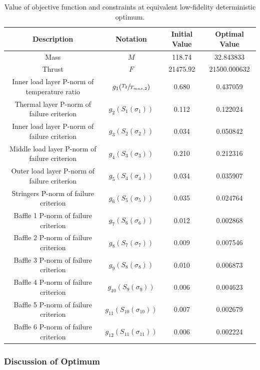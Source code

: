 \documentclass{article}
\begin{document}
\begin{table}
\caption[Equivalent low-fidelity deterministic optimization objective and constraint values]{Value of objective function and constraints at equivalent low-fidelity deterministic optimum.}
\label{tab:det-lo-optimal-values}
\begin{center}
\begin{tabular}[]{ c | c | c | c }
\textbf{Description} & \textbf{Notation} & \textbf{Initial Value} & \textbf{Optimal Value} \\ \hline
Mass & $M$ & 118.74 & 32.843833 \\ \hline
Thrust & $F$ & 21475.92 & 21500.000632 \\ \hline
Inner load layer P-norm of temperature ratio & $g_1(\sfrac{T_2}{T_{max,2}})$ & 0.680 & 0.437059 \\ \hline
Thermal layer P-norm of failure criterion & $g_2(S_1(\sigma_1))$ & 0.112 & 0.122024 \\ \hline
Inner load layer P-norm of failure criterion & $g_3(S_2(\sigma_2))$ & 0.034 & 0.050842 \\ \hline
Middle load layer P-norm of failure criterion & $g_4(S_3(\sigma_3))$ & 0.210 & 0.212316 \\ \hline
Outer load layer P-norm of failure criterion & $g_5(S_4(\sigma_4))$ & 0.034 & 0.035907 \\ \hline
Stringers P-norm of failure criterion & $g_6(S_5(\sigma_5))$ & 0.035 & 0.024764 \\ \hline
Baffle 1 P-norm of failure criterion & $g_7(S_6(\sigma_6))$ & 0.012 & 0.002868 \\ \hline
Baffle 2 P-norm of failure criterion & $g_8(S_7(\sigma_7))$ & 0.009 & 0.007546 \\ \hline
Baffle 3 P-norm of failure criterion & $g_9(S_8(\sigma_8))$ & 0.010 & 0.006873 \\ \hline
Baffle 4 P-norm of failure criterion & $g_{10}(S_9(\sigma_9))$ & 0.006 & 0.004623 \\ \hline
Baffle 5 P-norm of failure criterion & $g_{11}(S_{10}(\sigma_{10}))$ & 0.007 & 0.002679 \\ \hline
Baffle 6 P-norm of failure criterion & $g_{12}(S_{11}(\sigma_{11}))$ & 0.006 & 0.002224 \\ \hline
\end{tabular}
\end{center}
\end{table}

\subsubsection{Discussion of Optimum}
\end{document}
